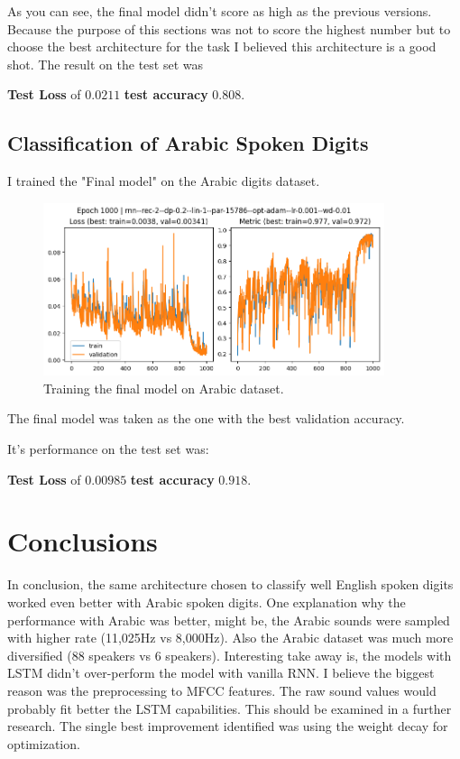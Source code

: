 \documentclass[a4paper,10pt]{article}
\begin{document}
As you can see, the final model didn't score as high as the previous versions.
Because the purpose of this sections was not to score the highest number but to choose the best architecture for the task I believed this architecture is a good shot.
The result on the test set was 

\textbf{Test Loss} of $0.0211$ \textbf{test accuracy} $0.808$.

\subsection{Classification of Arabic Spoken Digits}

I trained the "Final model" on the Arabic digits dataset.

\begin{figure}[H]
      \begin{center}
            \includegraphics[width=10cm]{figures/arabic--rnn--rec-2--dp-0.2--lin-1--par-15786--opt-adam--lr-0.001--wd-0.01--e-1000.png}
      \end{center}
      \caption{Training the final model on Arabic dataset.}
      \label{fig10}
\end{figure}

The final model was taken as the one with the best validation accuracy.

It's performance on the test set was:

\textbf{Test Loss} of $0.00985$ \textbf{test accuracy} $0.918$.

\section{Conclusions}

In conclusion, the same architecture chosen to classify well English spoken digits worked even better with Arabic spoken digits.
One explanation why the performance with Arabic was better, might be, the Arabic sounds were sampled with higher rate (11,025Hz vs 8,000Hz).
Also the Arabic dataset was much more diversified (88 speakers vs 6 speakers).
Interesting take away is, the models with LSTM didn't over-perform the model with vanilla RNN.
I believe the biggest reason was the preprocessing to MFCC features.
The raw sound values would probably fit better the LSTM capabilities.
This should be examined in a further research.
The single best improvement identified was using the weight decay for optimization.
\end{document}
